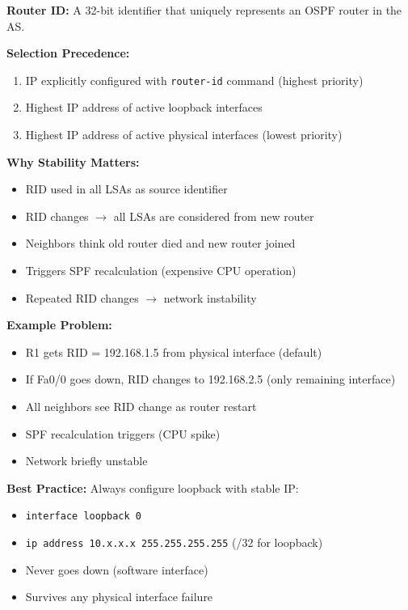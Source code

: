 \documentclass[12pt,a4paper]{article}
\begin{document}
\begin{abox}
\textbf{Router ID:} A 32-bit identifier that uniquely represents an OSPF router in the AS.

\textbf{Selection Precedence:}
\begin{enumerate}
    \item IP explicitly configured with \texttt{router-id} command (highest priority)
    \item Highest IP address of active loopback interfaces
    \item Highest IP address of active physical interfaces (lowest priority)
\end{enumerate}

\textbf{Why Stability Matters:}
\begin{itemize}
    \item RID used in all LSAs as source identifier
    \item RID changes $\rightarrow$ all LSAs are considered from new router
    \item Neighbors think old router died and new router joined
    \item Triggers SPF recalculation (expensive CPU operation)
    \item Repeated RID changes $\rightarrow$ network instability
\end{itemize}

\textbf{Example Problem:}
\begin{itemize}
    \item R1 gets RID = 192.168.1.5 from physical interface (default)
    \item If Fa0/0 goes down, RID changes to 192.168.2.5 (only remaining interface)
    \item All neighbors see RID change as router restart
    \item SPF recalculation triggers (CPU spike)
    \item Network briefly unstable
\end{itemize}

\textbf{Best Practice:} Always configure loopback with stable IP:
\begin{itemize}
    \item \texttt{interface loopback 0}
    \item \texttt{ip address 10.x.x.x 255.255.255.255} (/32 for loopback)
    \item Never goes down (software interface)
    \item Survives any physical interface failure
\end{itemize}
\end{abox}
\end{document}
